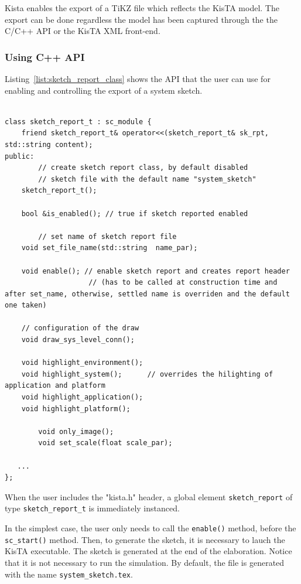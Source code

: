 Kista enables the export of a TiKZ file which reflects the KisTA model.
%
The export can be done regardless the model has been captured through the
the C/C++ API or the KisTA XML front-end.

\subsubsection{Using C++ API}
\label{sec:sketch_report_cpp_api}

Listing~\ref{list:sketch_report_class} shows the API that the user can use for enabling and controlling the export of a system sketch.

\begin{lstlisting}[style=KistaCodeStyle,caption={API for controling tracing tasks and scheduler activity.},label=list:sketch_report_class]

class sketch_report_t : sc_module {
	friend sketch_report_t& operator<<(sketch_report_t& sk_rpt, std::string content);
public:
		// create sketch report class, by default disabled
		// sketch file with the default name "system_sketch"
	sketch_report_t();
	
	bool &is_enabled(); // true if sketch reported enabled
	
		// set name of sketch report file
	void set_file_name(std::string	name_par); 
	
	void enable(); // enable sketch report and creates report header
	                // (has to be called at construction time and after set_name, otherwise, settled name is overriden and the default one taken)
	
	// configuration of the draw
	void draw_sys_level_conn();
	
	void highlight_environment();
	void highlight_system();      // overrides the hilighting of application and platform
	void highlight_application();
	void highlight_platform();

        void only_image();
        void set_scale(float scale_par);

   ...
};

\end{lstlisting}

When the user includes the "kista.h" header, a global element \texttt{sketch\_report} of type \texttt{sketch\_report\_t}
is immediately instanced.

In the simplest case, the user only needs to call the \texttt{enable()} method, before the \texttt{sc\_start()} method.
Then, to generate the sketch, it is necessary to lauch the KisTA executable.
The sketch is generated at the end of the elaboration.
Notice that it is not necessary to run the simulation.
By default, the file is generated with the name \texttt{system\_sketch.tex}.

